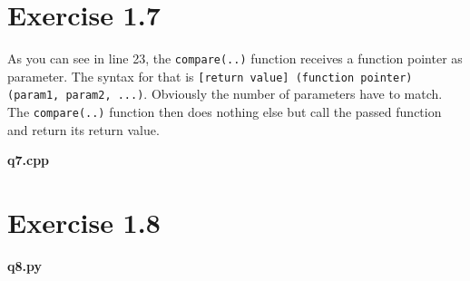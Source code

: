 \documentclass{article} %
\newcommand{\homeworkNumber}{1} %
\begin{document}
\section*{Exercise \homeworkNumber.7}

As you can see in line 23, the \verb|compare(..)| function receives a function pointer as parameter. The syntax for that is \verb|[return value] (function pointer) (param1, param2, ...)|. Obviously the number of parameters have to match. The \verb|compare(..)| function then does nothing else but call the passed function and return its return value.

\textbf{q7.cpp}
\lstset{language=C++}



\section*{Exercise \homeworkNumber.8}
\textbf{q8.py}
\lstset{language=Python}

\end{document}
